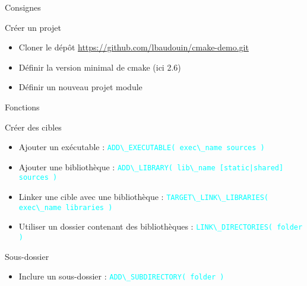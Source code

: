 \documentclass{beamer}
\begin{document}
\begin{frame}{Consignes}

  \begin{exampleblock}{Créer un projet}
    \begin{itemize}
    \item Cloner le dépôt 
    \url{https://github.com/lbaudouin/cmake-demo.git}
    \item Définir la version minimal de cmake (ici 2.6)
	\item Définir un nouveau projet \og module \fg
    \end{itemize}
  \end{exampleblock}

\end{frame}


\begin{frame}[fragile]{Fonctions}
  \begin{block}{Créer des cibles}
    \begin{itemize}
    \item Ajouter un exécutable :\linebreak
      \textcolor{cyan}{\verb?ADD\_EXECUTABLE( exec\_name sources )?}
    \item Ajouter une bibliothèque :\linebreak
      \textcolor{cyan}{\verb?ADD\_LIBRARY( lib\_name [static|shared] sources )?}
    \item Linker une cible avec une bibliothèque :\linebreak
      \textcolor{cyan}{\verb?TARGET\_LINK\_LIBRARIES( exec\_name libraries )?}%
    \item Utiliser un dossier contenant des bibliothèques :\linebreak
      \textcolor{cyan}{\verb?LINK\_DIRECTORIES( folder )?}
    \end{itemize}
  \end{block}

  \begin{block}{Sous-dossier}
    \begin{itemize}
    \item Inclure un sous-dossier :\linebreak
      \textcolor{cyan}{\verb?ADD\_SUBDIRECTORY( folder )?}
    \end{itemize}
  \end{block}
\end{frame}
\end{document}
